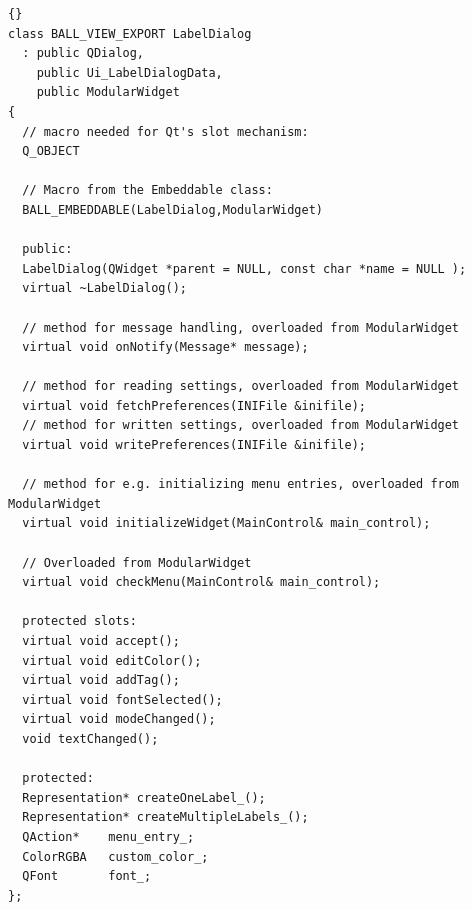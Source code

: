 \begin{lstlisting}{}
class BALL_VIEW_EXPORT LabelDialog 
  : public QDialog,
    public Ui_LabelDialogData,
    public ModularWidget
{
  // macro needed for Qt's slot mechanism:
  Q_OBJECT

  // Macro from the Embeddable class:
  BALL_EMBEDDABLE(LabelDialog,ModularWidget)
	
  public:
  LabelDialog(QWidget *parent = NULL, const char *name = NULL );
  virtual ~LabelDialog();
					
  // method for message handling, overloaded from ModularWidget
  virtual void onNotify(Message* message);
					
  // method for reading settings, overloaded from ModularWidget
  virtual void fetchPreferences(INIFile &inifile);
  // method for written settings, overloaded from ModularWidget
  virtual void writePreferences(INIFile &inifile);
		
  // method for e.g. initializing menu entries, overloaded from ModularWidget
  virtual void initializeWidget(MainControl& main_control);

  // Overloaded from ModularWidget
  virtual void checkMenu(MainControl& main_control);
	
  protected slots:
  virtual void accept();
  virtual void editColor();
  virtual void addTag();
  virtual void fontSelected();
  virtual void modeChanged();
  void textChanged();

  protected:
  Representation* createOneLabel_();
  Representation* createMultipleLabels_();
  QAction*    menu_entry_;
  ColorRGBA   custom_color_;
  QFont       font_;
};
\end{lstlisting}

